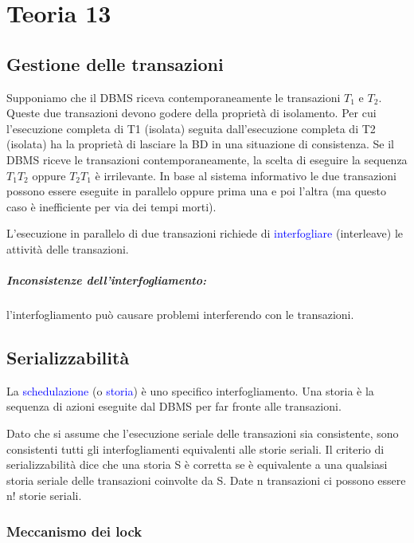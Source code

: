 \chapter{Teoria 13}

\section{Gestione delle transazioni}

Supponiamo che il DBMS riceva contemporaneamente le transazioni $T_1$ e $T_2$. Queste due transazioni devono godere della proprietà di isolamento. Per cui l’esecuzione completa di T1 (isolata) seguita dall’esecuzione completa di T2 (isolata) ha la proprietà di lasciare la BD in una situazione di consistenza. Se il DBMS riceve le transazioni contemporaneamente, la
scelta di eseguire la sequenza $T_1 T_2$ oppure $T_2 T_1$ è irrilevante. In base al sistema informativo le due transazioni possono essere eseguite in parallelo oppure prima una e poi l'altra (ma questo caso è inefficiente per via dei tempi morti).

L’esecuzione in parallelo di due transazioni richiede di \textcolor{blue}{interfogliare} (interleave) le attività delle transazioni.

\paragraph{Inconsistenze dell'interfogliamento:} l'interfogliamento può causare problemi interferendo con le transazioni.

\section{Serializzabilità}

La \textcolor{blue}{schedulazione} (o \textcolor{blue}{storia}) è uno specifico interfogliamento. Una storia è la sequenza di azioni eseguite dal DBMS per far fronte alle transazioni.

Dato che si assume che l’esecuzione seriale delle transazioni sia consistente, sono consistenti tutti gli interfogliamenti equivalenti alle storie seriali. Il criterio di serializzabilità dice che una storia S è corretta se è equivalente a una qualsiasi storia seriale delle transazioni coinvolte da S. Date n transazioni ci possono essere n! storie seriali.

\subsection{Meccanismo dei lock}

